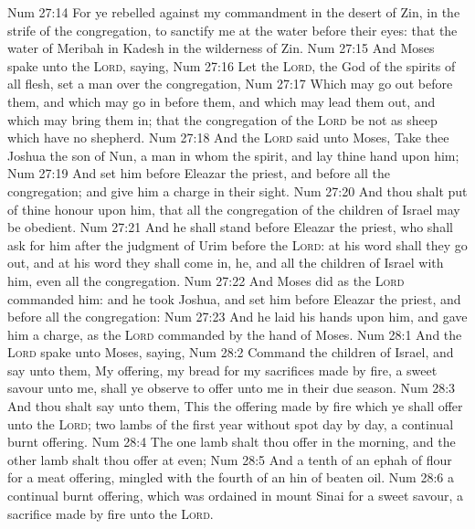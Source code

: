 \vs Num 27:14 For ye rebelled against my commandment in the desert of Zin, in the strife of the congregation, to sanctify me at the water before their eyes: that  the water of Meribah in Kadesh in the wilderness of Zin.
\vs Num 27:15 And Moses spake unto the \textsc{Lord}, saying,
\vs Num 27:16 Let the \textsc{Lord}, the God of the spirits of all flesh, set a man over the congregation,
\vs Num 27:17 Which may go out before them, and which may go in before them, and which may lead them out, and which may bring them in; that the congregation of the \textsc{Lord} be not as sheep which have no shepherd.
\vs Num 27:18 And the \textsc{Lord} said unto Moses, Take thee Joshua the son of Nun, a man in whom  the spirit, and lay thine hand upon him;
\vs Num 27:19 And set him before Eleazar the priest, and before all the congregation; and give him a charge in their sight.
\vs Num 27:20 And thou shalt put  of thine honour upon him, that all the congregation of the children of Israel may be obedient.
\vs Num 27:21 And he shall stand before Eleazar the priest, who shall ask  for him after the judgment of Urim before the \textsc{Lord}: at his word shall they go out, and at his word they shall come in,  he, and all the children of Israel with him, even all the congregation.
\vs Num 27:22 And Moses did as the \textsc{Lord} commanded him: and he took Joshua, and set him before Eleazar the priest, and before all the congregation:
\vs Num 27:23 And he laid his hands upon him, and gave him a charge, as the \textsc{Lord} commanded by the hand of Moses.
\vs Num 28:1 And the \textsc{Lord} spake unto Moses, saying,
\vs Num 28:2 Command the children of Israel, and say unto them, My offering,  my bread for my sacrifices made by fire,  a sweet savour unto me, shall ye observe to offer unto me in their due season.
\vs Num 28:3 And thou shalt say unto them, This  the offering made by fire which ye shall offer unto the \textsc{Lord}; two lambs of the first year without spot day by day,  a continual burnt offering.
\vs Num 28:4 The one lamb shalt thou offer in the morning, and the other lamb shalt thou offer at even;
\vs Num 28:5 And a tenth  of an ephah of flour for a meat offering, mingled with the fourth  of an hin of beaten oil.
\vs Num 28:6  a continual burnt offering, which was ordained in mount Sinai for a sweet savour, a sacrifice made by fire unto the \textsc{Lord}.
